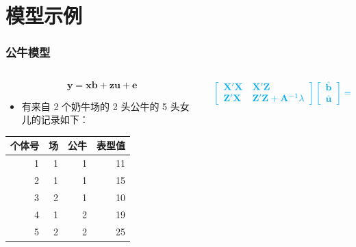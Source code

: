 \documentclass[serif,aspectratio=169]{beamer}
\begin{document}
\section{模型示例}
\begin{frame}
  \frametitle{公牛模型}
  \begin{columns}
    \begin{column}{.4\textwidth}
      $$\mathbf{y=xb+zu+e}$$
      \begin{itemize}
      \item 有来自 2 个奶牛场的 2 头公牛的 5 头女儿的记录如下：
      \end{itemize}
      \centering
      \begin{tabular}{rrrr}
        个体号 & 场 & 公牛 & 表型值\\\hline
        1 & 1 & 1 & 11\\
        2 & 1 & 1 & 15\\
        3 & 2 & 1 & 10\\
        4 & 1 & 2 & 19\\
        5 & 2 & 2 & 25
      \end{tabular}
    \end{column}
    
    \pause
    \begin{column}{.6\textwidth}
      $$
      \color{cyan}\left[\begin{array}{ll}
          \mathbf{X}'\mathbf{X} & \mathbf{X}'\mathbf{Z}\\
          \mathbf{Z}'\mathbf{X} & \mathbf{Z}'\mathbf{Z}+\mathbf{A}^{-1}\lambda
        \end{array}\right]
      \left[\begin{array}{cc}
          \hat{\mathbf{b}}\\
          \hat{\mathbf{u}}
        \end{array}\right] = 
      \left[\begin{array}{c}
          \mathbf{X}'\mathbf{y}\\
          \mathbf{Z}'\mathbf{y}
        \end{array}\right]
      $$
    \end{column}
  \end{columns}
\end{frame}
\end{document}
